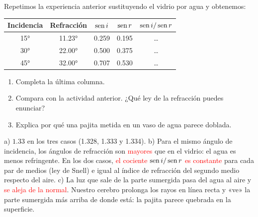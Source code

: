 \begin{exercise}
    Repetimos la experiencia anterior sustituyendo el vidrio por agua y obtenemos:
    \begin{center}
        \begin{tabular}{@{}ccccc@{}}
            \toprule
            \textbf{Incidencia} & \textbf{Refracción} & \textbf{\(\operatorname{sen} i\)} & \textbf{\(\operatorname{sen} r\)} & \textbf{\(\operatorname{sen} i / \operatorname{sen} r\)} \\
            \midrule
            \ang{15} & \ang{11.23} & \num{0.259} & \num{0.195} & \ldots \\[3pt]
            \ang{30} & \ang{22.00} & \num{0.500} & \num{0.375} & \ldots \\[3pt]
            \ang{45} & \ang{32.00} & \num{0.707} & \num{0.530} & \ldots \\
            \bottomrule
        \end{tabular}
    \end{center}
    \begin{enumerate}[label=\alph*)]
        \item Completa la última columna.
        \item Compara con la actividad anterior. ¿Qué ley de la refracción puedes enunciar?
        \item Explica por qué una pajita metida en un vaso de agua parece doblada.
    \end{enumerate}
    \begin{solu}
        a) \(\num{1.33}\) en los tres casos (\num{1.328}, \num{1.333} y \num{1.334}).
        b) Para el mismo ángulo de incidencia, los ángulos de refracción son \textcolor{red}{mayores} que en el vidrio: el agua es menos refringente. En los dos casos, \textcolor{red}{el cociente \(\operatorname{sen} i / \operatorname{sen} r\) es constante} para cada par de medios (ley de Snell) e igual al índice de refracción del segundo medio respecto del aire.
        c) La luz que sale de la parte sumergida pasa del agua al aire y \textcolor{red}{se aleja de la normal}. Nuestro cerebro prolonga los rayos en línea recta y «ve» la parte sumergida más arriba de donde está: la pajita parece quebrada en la superficie.
    \end{solu}
\end{exercise}

